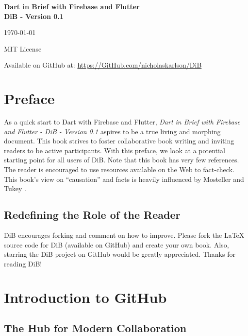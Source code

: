 \documentclass{book}
\begin{document}
\begin{titlepage}
    \centering
    \vspace*{5cm}
    {\Huge\textbf{Dart in Brief with Firebase and Flutter\\ DiB - Version 0.1}\par}
    \vspace{2cm}
    {\Large\today\par}
    \vspace{1cm}
    {\large MIT License\par}
    \vspace{1cm}
    {Available on GitHub at: \url{https://GitHub.com/nicholaskarlson/DiB}\par}
\end{titlepage}

\tableofcontents
\cleardoublepage

\chapter*{Preface}
As a quick start to Dart with Firebase and Flutter, \emph{Dart in Brief with Firebase and Flutter - DiB - Version 0.1} aspires to be a true living and morphing document. This book strives to foster collaborative book writing and inviting readers to be active participants. With this preface, we look at a potential starting point for all users of DiB. Note that this book has very few references. The reader is encouraged to use resources available on the Web to fact-check. This book's view on ``causation'' and facts is heavily influenced by Mosteller and Tukey \cite{mosteller1977}.

\section*{Redefining the Role of the Reader}
DiB encourages forking and comment on how to improve. Please fork the LaTeX source code for DiB (available on GitHub) and create your own book. Also, starring the DiB project on GitHub would be greatly appreciated. Thanks for reading DiB!

\chapter{Introduction to GitHub}
\section*{The Hub for Modern Collaboration}
\end{document}
